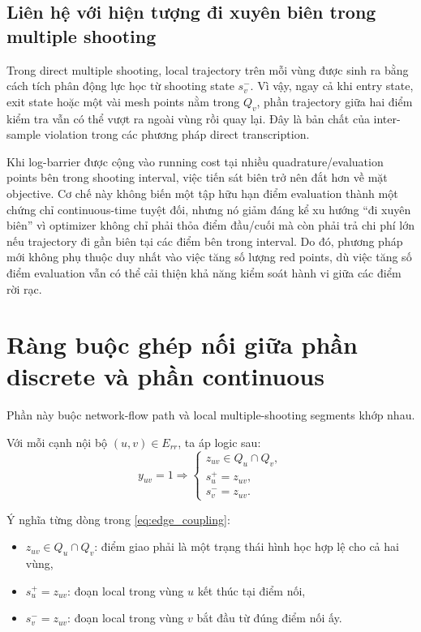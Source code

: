 \documentclass[12pt]{article}
\begin{document}
\subsection{Liên hệ với hiện tượng đi xuyên biên trong multiple shooting}

Trong direct multiple shooting, local trajectory trên mỗi vùng được sinh ra bằng cách tích phân động lực học từ shooting state $s_v^-$. Vì vậy, ngay cả khi entry state, exit state hoặc một vài mesh points nằm trong $Q_v$, phần trajectory giữa hai điểm kiểm tra vẫn có thể vượt ra ngoài vùng rồi quay lại. Đây là bản chất của inter-sample violation trong các phương pháp direct transcription.

Khi log-barrier được cộng vào running cost tại nhiều quadrature/evaluation points bên trong shooting interval, việc tiến sát biên trở nên đắt hơn về mặt objective. Cơ chế này không biến một tập hữu hạn điểm evaluation thành một chứng chỉ continuous-time tuyệt đối, nhưng nó giảm đáng kể xu hướng ``đi xuyên biên'' vì optimizer không chỉ phải thỏa điểm đầu/cuối mà còn phải trả chi phí lớn nếu trajectory đi gần biên tại các điểm bên trong interval. Do đó, phương pháp mới không phụ thuộc duy nhất vào việc tăng số lượng red points, dù việc tăng số điểm evaluation vẫn có thể cải thiện khả năng kiểm soát hành vi giữa các điểm rời rạc.

\section{Ràng buộc ghép nối giữa phần discrete và phần continuous}

Phần này buộc network-flow path và local multiple-shooting segments khớp nhau.

Với mỗi cạnh nội bộ $(u,v)\in E_{rr}$, ta áp logic sau:
\begin{equation}
y_{uv}=1 \Longrightarrow
\begin{cases}
z_{uv}\in Q_u\cap Q_v,\\
s_u^+=z_{uv},\\
s_v^-=z_{uv}.
\end{cases}
\label{eq:edge_coupling}
\end{equation}

Ý nghĩa từng dòng trong \eqref{eq:edge_coupling}:
\begin{itemize}
    \item $z_{uv}\in Q_u\cap Q_v$: điểm giao phải là một trạng thái hình học hợp lệ cho cả hai vùng,
    \item $s_u^+=z_{uv}$: đoạn local trong vùng $u$ kết thúc tại điểm nối,
    \item $s_v^-=z_{uv}$: đoạn local trong vùng $v$ bắt đầu từ đúng điểm nối ấy.
\end{itemize}
\end{document}
